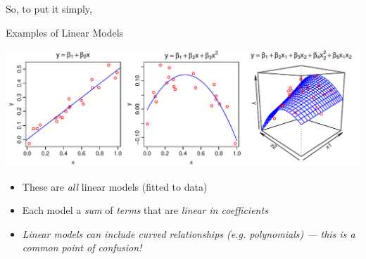 \documentclass[xcolor=x11names,compress]{beamer}
\renewcommand{\(}{\begin{columns}}
\renewcommand{\)}{\end{columns}}
\newcommand{\<}[1]{\begin{column}{#1}}
\renewcommand{\>}{\end{column}}
\begin{document}
\begin{frame}{So, to put it simply,}
\end{frame}


\begin{frame}{Examples of Linear Models}

    \includegraphics[width=\textwidth]{Linear.pdf}
    
    \begin{itemize}\itemsep10pt
    \item These are {\it all} linear models (fitted to data)
    \item Each model a {\it sum} of {\it terms} that are {\it linear in coefficients}
    \item {\it Linear models can include curved relationships (e.g. polynomials) --- this is a common point of confusion!}
    \end{itemize}
    
    \end{frame}
    
\end{document}
